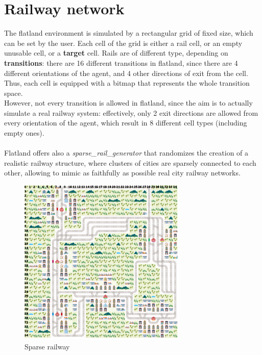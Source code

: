 \section{Railway network}
The flatland environment is simulated by a rectangular grid of fixed size, which can be set by the user. Each cell of the grid is either a rail cell, or an empty unusable cell, or a \textbf{target} cell. Rails are of different type, depending on \textbf{transitions}: there are 16 different transitions in flatland, since there are 4 different orientations of the agent, and 4 other directions of exit from the cell. Thus, each cell is equipped with a bitmap that represents the whole transition space. \\ However, not every transition is allowed in flatland, since the aim is to actually simulate a real railway system: effectively, only 2 exit directions are allowed from every orientation of the agent, which result in 8 different cell types (including empty ones).\\ \\
Flatland offers also a \textit{sparse\_rail\_generator} that randomizes the creation of a realistic railway structure, where clusters of cities are sparsely connected to each other, allowing to mimic as faithfully as possible real city railway networks.

\begin{figure}[H] 
\includegraphics[height=80mm, width=80mm, scale=0.5]{chapters/sparse_railway.png}
\centering
\caption{Sparse railway}
\label{fig:s1} 
\end{figure}

